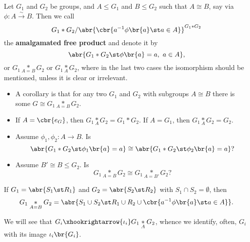 \begin{definition}
Let $ G_1 $ and $ G_2 $ be groups, and $ A \le G_1 $ and $ B \le G_2 $ such that $ A \cong B $, say via $ \phi : A \xrightarrow{\sim} B $. Then we call
$$ G_1 * G_2 / \abr{\cbr{a^{-1}\phi\br{a} \st a \in A}}^{G_1 * G_2} $$
the \textbf{amalgamated free product} and denote it by
$$ \abr{G_1 * G_2 \st \phi\br{a} = a, \ a \in A}, $$
or $ G_1 \underset{A = B}{*} G_2 $ or $ G_1 \underset{A}{*} G_2 $, where in the last two cases the isomorphism should be mentioned, unless it is clear or irrelevant.
\end{definition}

\begin{remark}
\hfill
\begin{itemize}
\item A corollary is that for any two $ G_1 $ and $ G_2 $ with subgroups $ A \cong B $ there is some $ G \cong G_1 \underset{A = B}{*} G_2 $.
\item If $ A = \cbr{e_G} $, then $ G_1 \underset{A}{*} G_2 = G_1 * G_2 $. If $ A = G_1 $, then $ G_1 \underset{A}{*} G_2 = G_2 $.
\end{itemize}
\end{remark}

\begin{exercise}
\hfill
\begin{itemize}
\item Assume $ \phi_1, \phi_2 : A \to B $. Is
$$ \abr{G_1 * G_2 \st \phi_1\br{a} = a} \cong \abr{G_1 * G_2 \st \phi_2\br{a} = a}? $$
\item Assume $ B' \cong B \le G_2 $. Is
$$ G_1 \underset{A = B}{*} G_2 \cong G_1 \underset{A = B'}{*} G_2? $$
\end{itemize}
\end{exercise}

\begin{exercise}
\label{ex:2.2.4}
If $ G_1 = \abr{S_1 \st R_1} $ and $ G_2 = \abr{S_2 \st R_2} $ with $ S_1 \cap S_2 = \emptyset $, then
$$ G_1 \underset{A = B}{*} G_2 = \abr{S_1 \cup S_2 \st R_1 \cup R_2 \cup \cbr{a^{-1}\phi\br{a} \st a \in A}}. $$
\end{exercise}

We will see that $ G_i \xhookrightarrow{\iota_i} G_1 \underset{A}{*} G_2 $, whence we identify, often, $ G_i $ with its image $ \iota_i\br{G_i} $.

\pagebreak

